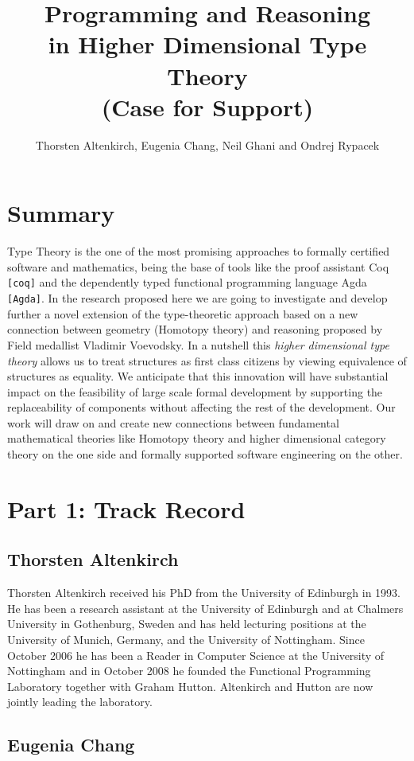 \documentclass[a4paper]{article}
\title{Programming and Reasoning\\ in Higher Dimensional Type Theory \\
\LARGE (Case for Support)}
\author{Thorsten Altenkirch, Eugenia Chang, Neil Ghani and Ondrej Rypacek}
\date{}
\renewcommand{\cite}[1]{{\tt[#1]}}
\begin{document}
\maketitle
\section*{Summary}
Type Theory is the one of the most promising approaches to formally
certified software and mathematics, being the base of tools like the
proof assistant Coq \cite{coq} and the dependently typed functional
programming language Agda \cite{Agda}. In the research proposed here
we are going to investigate and develop further a novel extension of
the type-theoretic approach based on a new connection between geometry
(Homotopy theory) and reasoning proposed by Field medallist Vladimir
Voevodsky. In a nutshell this \emph{higher dimensional type theory}
allows us to treat structures as first class citizens by viewing
equivalence of structures as equality. We anticipate that this
innovation will have substantial impact on the feasibility of large scale
formal development by supporting the replaceability of components
without affecting the rest of the development. Our work will draw on
and create new connections between fundamental mathematical theories
like Homotopy theory and higher dimensional category theory on the one
side and formally supported software engineering on the other.


\section*{Part 1: Track Record}

\subsection*{Thorsten Altenkirch}
Thorsten Altenkirch received his PhD from the University of
Edinburgh in 1993. He has been a research assistant at the University of
Edinburgh and at Chalmers University in Gothenburg, Sweden and has
held lecturing positions at the University of Munich, Germany, and the
University of Nottingham. Since October 2006 he has been a Reader in
Computer Science at the University of Nottingham and in October
2008 he founded the Functional Programming Laboratory together with
Graham Hutton. Altenkirch and Hutton are now jointly leading the
laboratory.


\subsection*{Eugenia Chang}
\end{document}
